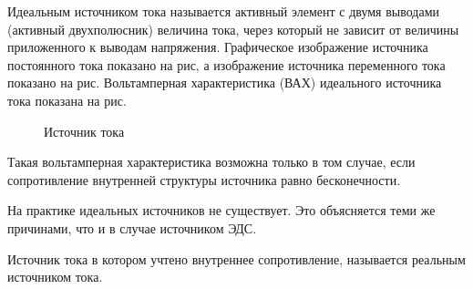 \begin{itemize}
	Идеальным источником тока называется активный элемент с двумя выводами (активный двухполюсник) величина тока, через который не зависит от величины приложенного к выводам напряжения. Графическое изображение источника постоянного тока показано на рис, а изображение источника переменного тока показано на рис. Вольтамперная характеристика (ВАХ) идеального источника тока показана на рис.
\begin{center}
	\begin{figure}[h!]
		\caption{ Источник тока}	
	\end{figure}
\end{center}
	Такая вольтамперная характеристика возможна только в том случае, если сопротивление внутренней структуры источника равно бесконечности.

	На практике идеальных источников не существует. Это объясняется теми же причинами, что и в случае источником ЭДС.

	Источник тока в котором учтено внутреннее сопротивление, называется реальным источником тока.
\end{itemize}

\pagebreak